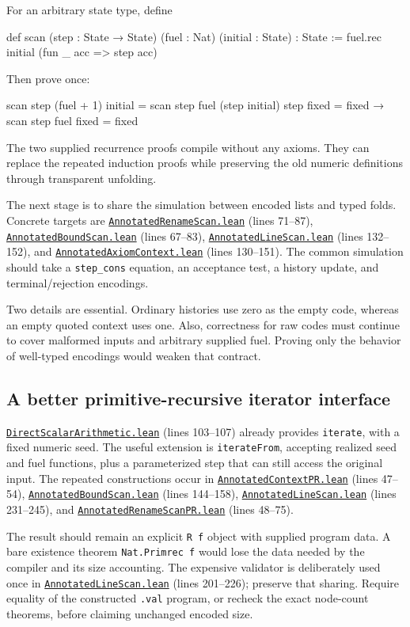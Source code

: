 \documentclass[11pt,letterpaper]{article}
\newcommand{\code}[1]{\nolinkurl{#1}}
\newcommand{\src}[2]{\href{https://github.com/VladimirReshetnikov/ProveIt/blob/60e9c5d620c6c387d932876cfa2d9376f64ea56c/Computability/DiophantineConsistency/Lean/DiophantineConsistency/#1.lean}{\nolinkurl{#1.lean}} (lines #2)}
\begin{document}
For an arbitrary state type, define
\begin{Lean}
def scan (step : State → State) (fuel : Nat)
    (initial : State) : State :=
  fuel.rec initial (fun _ acc => step acc)
\end{Lean}
Then prove once:
\begin{Lean}
scan step (fuel + 1) initial = scan step fuel (step initial)
step fixed = fixed → scan step fuel fixed = fixed
\end{Lean}
The two supplied recurrence proofs compile without any axioms.
They can replace the repeated induction proofs while preserving the old
numeric definitions through transparent unfolding.

The next stage is to share the simulation between encoded lists and typed
folds. Concrete targets are \src{AnnotatedRenameScan}{71--87},
\src{AnnotatedBoundScan}{67--83}, \src{AnnotatedLineScan}{132--152},
and \src{AnnotatedAxiomContext}{130--151}. The common simulation should
take a \code{step_cons} equation, an acceptance test, a history update,
and terminal/rejection encodings.

Two details are essential. Ordinary histories use zero as the empty code,
whereas an empty quoted context uses one. Also, correctness for raw codes
must continue to cover malformed inputs and arbitrary supplied fuel.
Proving only the behavior of well-typed encodings would weaken that contract.

\subsection{A better primitive-recursive iterator interface}

\src{DirectScalarArithmetic}{103--107} already provides
\code{iterate}, with a fixed numeric seed. The useful extension is
\code{iterateFrom}, accepting realized seed and fuel functions, plus a
parameterized step that can still access the original input. The repeated
constructions occur in \src{AnnotatedContextPR}{47--54},
\src{AnnotatedBoundScan}{144--158}, \src{AnnotatedLineScan}{231--245},
and \src{AnnotatedRenameScanPR}{48--75}.

The result should remain an explicit \code{R f} object with supplied
program data. A bare existence theorem \code{Nat.Primrec f} would lose
the data needed by the compiler and its size accounting. The expensive
validator is deliberately used once in
\src{AnnotatedLineScan}{201--226}; preserve that sharing. Require
equality of the constructed \code{.val} program, or recheck the exact
node-count theorems, before claiming unchanged encoded size.
\end{document}
